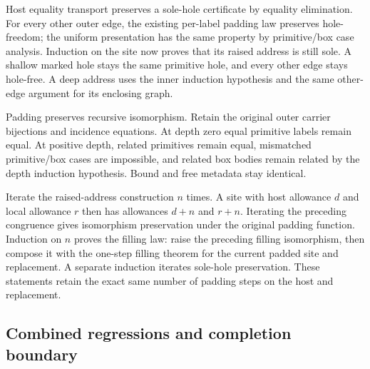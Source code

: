 Host equality transport preserves a sole-hole certificate by equality
elimination. For every other outer edge, the existing per-label padding law
preserves hole-freedom; the uniform presentation has the same property by
primitive/box case analysis. Induction on the site now proves that its raised
address is still sole. A shallow marked hole stays the same primitive hole,
and every other edge stays hole-free. A deep address uses the inner induction
hypothesis and the same other-edge argument for its enclosing graph.





Padding preserves recursive isomorphism. Retain the original outer carrier
bijections and incidence equations. At depth zero equal primitive labels
remain equal. At positive depth, related primitives remain equal, mismatched
primitive/box cases are impossible, and related box bodies remain related by
the depth induction hypothesis. Bound and free metadata stay identical.

Iterate the raised-address construction $n$ times. A site with host allowance
$d$ and local allowance $r$ then has allowances $d+n$ and $r+n$. Iterating the
preceding congruence gives isomorphism preservation under the original padding
function. Induction on $n$ proves the filling law: raise the preceding filling
isomorphism, then compose it with the one-step filling theorem for the current
padded site and replacement. A separate induction iterates sole-hole
preservation. These statements retain the exact same number of padding steps
on the host and replacement.







\subsection{Combined regressions and completion boundary}

